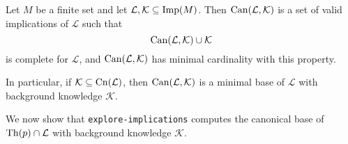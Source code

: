 \begin{Corollary}
  \label{cor:canonical-base-for-implications}
  Let $M$ be a finite set and let $\mathcal{L}, \mathcal{K} \subseteq \operatorname{Imp}(M)$.  Then
  $\operatorname{Can}(\mathcal{L}, \mathcal{K})$ is a set of valid implications of $\mathcal{L}$ such
  that
  \begin{equation*}
    \operatorname{Can}(\mathcal{L}, \mathcal{K}) \cup \mathcal{K}
  \end{equation*}
  is complete for $\mathcal{L}$, and $\operatorname{Can}(\mathcal{L}, \mathcal{K})$ has minimal
  cardinality with this property.

  In particular, if $\mathcal{K} \subseteq \operatorname{Cn}(\mathcal{L})$, then $\operatorname{Can}(\mathcal{L},
  \mathcal{K})$ is a minimal base of $\mathcal{L}$ with background knowledge
  $\mathcal{K}$.
\end{Corollary}

We now show that \lstinline{explore-implications} computes the canonical base of $\operatorname{Th}(p)
\cap \mathcal{L}$ with background knowledge $\mathcal{K}$.

